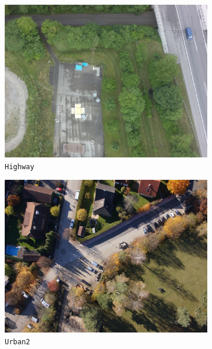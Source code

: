 \begin{figure}[tbp]
\begin{subfigure}[b]{0.243\textwidth}
           \includegraphics[width=\textwidth]{figures_dataset/highway_org_uav.jpg}
           \caption{\texttt{Highway}}
       \end{subfigure}
       \hfill
       \begin{subfigure}[b]{0.243\textwidth}   
           \centering 
           \includegraphics[width=\textwidth]{figures_dataset/eichenau_org_uav2.jpg}
           \caption{\texttt{Urban2}}
       \end{subfigure}
       \hfill
       \begin{subfigure}[b]{0.243\textwidth}   
           \centering 

\end{subfigure}
\end{figure}
